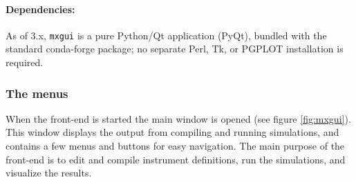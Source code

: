 \paragraph{Dependencies:}
As of \MCX 3.x, \verb+mxgui+ is a pure Python/Qt application (PyQt), bundled
with the standard conda-forge \MCX package; no separate Perl, Tk, or PGPLOT
installation is required.

\subsubsection{The menus}

When the front-end is started the main window is opened (see figure
\ref{fig:mxgui}). This window displays the output from compiling and running
simulations, and contains a few menus and buttons for easy navigation. The main
purpose of the front-end is to edit and compile instrument definitions, run the
simulations, and visualize the results.

